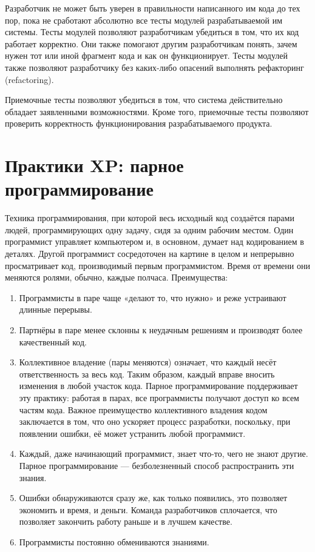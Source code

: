 \documentclass{article}
\let\stdsection\section
\renewcommand\section{\newpage\stdsection}
\begin{document}
    Разработчик не может быть уверен в правильности написанного им кода до тех пор, пока не сработают абсолютно все тесты модулей разрабатываемой им системы. Тесты модулей позволяют разработчикам убедиться в том, что их код работает корректно. Они также помогают другим разработчикам понять, зачем нужен тот или иной фрагмент кода и как он функционирует. Тесты модулей также позволяют разработчику без каких-либо опасений выполнять рефакторинг (refactoring).

    Приемочные тесты позволяют убедиться в том, что система действительно обладает заявленными возможностями. Кроме того, приемочные тесты позволяют проверить корректность функционирования разрабатываемого продукта.

\section{Практики XP: парное программирование}
    Техника программирования, при которой весь исходный код создаётся парами людей, программирующих одну задачу, сидя за одним рабочим местом. Один программист управляет компьютером и, в основном, думает над кодированием в деталях. Другой программист сосредоточен на картине в целом и непрерывно просматривает код, производимый первым программистом. Время от времени они меняются ролями, обычно, каждые полчаса.
    Преимущества:
    \begin{enumerate}
        \item Программисты в паре чаще «делают то, что нужно» и реже устраивают длинные перерывы.
        \item Партнёры в паре менее склонны к неудачным решениям и производят более качественный код.
        \item Коллективное владение (пары меняются) означает, что каждый несёт ответственность за весь код. Таким образом, каждый вправе вносить изменения в любой участок кода. Парное программирование поддерживает эту практику: работая в парах, все программисты получают доступ ко всем частям кода. Важное преимущество коллективного владения кодом заключается в том, что оно ускоряет процесс разработки, поскольку, при появлении ошибки, её может устранить любой программист.
        \item Каждый, даже начинающий программист, знает что-то, чего не знают другие. Парное программирование — безболезненный способ распространить эти знания.
        \item Ошибки обнаруживаются сразу же, как только появились, это позволяет экономить и время, и деньги. Команда разработчиков сплочается, что позволяет закончить работу раньше и в лучшем качестве.
        \item Программисты постоянно обмениваются знаниями.
    \end{enumerate}
\end{document}
